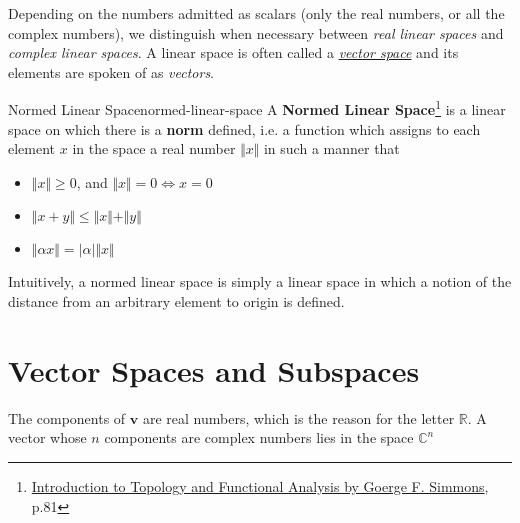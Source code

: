 Depending on the numbers admitted as scalars (only the real numbers, or all the complex numbers), we distinguish when
necessary between \textit{real linear spaces} and \textit{complex linear spaces}. A linear space is often called a
\hyperlink{vector-space}{\textit{vector space}} and its elements are spoken of as \textit{vectors}.

\begin{Definition}{Normed Linear Space}{normed-linear-space}
    A \textbf{Normed Linear Space}\footnote{\href{https://trello.com/c/3EPccNTa}{Introduction to Topology and Functional Analysis by Goerge F. Simmons}, p.81}
    is a linear space on which there is a \textbf{norm} defined, i.e. a function which assigns to each element $x$ in
    the space a real number $\Vert x \Vert$ in such a manner that

    \begin{itemize}
        \item $\Vert x \Vert \ge 0$, and $\Vert x \Vert = 0 \iff x = 0$
        \item $\Vert x + y \Vert \le \Vert x \Vert + \Vert y \Vert$
        \item $\Vert \alpha x \Vert = \vert \alpha \vert \Vert x \Vert$
    \end{itemize}
\end{Definition}

Intuitively, a normed linear space is simply a linear space in which a notion of the distance from an arbitrary element
to origin is defined.



\section{Vector Spaces and Subspaces}


The components of $\boldsymbol{v}$ are real numbers, which is the reason for the letter $\mathbb{R}$. A vector whose $n$
components are complex numbers lies in the space $\mathbb{C}^n$

